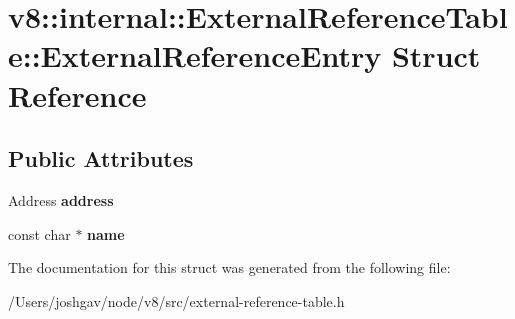 \hypertarget{structv8_1_1internal_1_1_external_reference_table_1_1_external_reference_entry}{}\section{v8\+:\+:internal\+:\+:External\+Reference\+Table\+:\+:External\+Reference\+Entry Struct Reference}
\label{structv8_1_1internal_1_1_external_reference_table_1_1_external_reference_entry}
\subsection*{Public Attributes}
\begin{DoxyCompactItemize}
\item 
Address {\bfseries address}\hypertarget{structv8_1_1internal_1_1_external_reference_table_1_1_external_reference_entry_a18efc1be93bf777df6529df9b96c605e}{}\label{structv8_1_1internal_1_1_external_reference_table_1_1_external_reference_entry_a18efc1be93bf777df6529df9b96c605e}

\item 
const char $\ast$ {\bfseries name}\hypertarget{structv8_1_1internal_1_1_external_reference_table_1_1_external_reference_entry_a6b6f95b4e077c07564d5da8ab763067c}{}\label{structv8_1_1internal_1_1_external_reference_table_1_1_external_reference_entry_a6b6f95b4e077c07564d5da8ab763067c}

\end{DoxyCompactItemize}


The documentation for this struct was generated from the following file\+:\begin{DoxyCompactItemize}
\item 
/\+Users/joshgav/node/v8/src/external-\/reference-\/table.\+h\end{DoxyCompactItemize}
